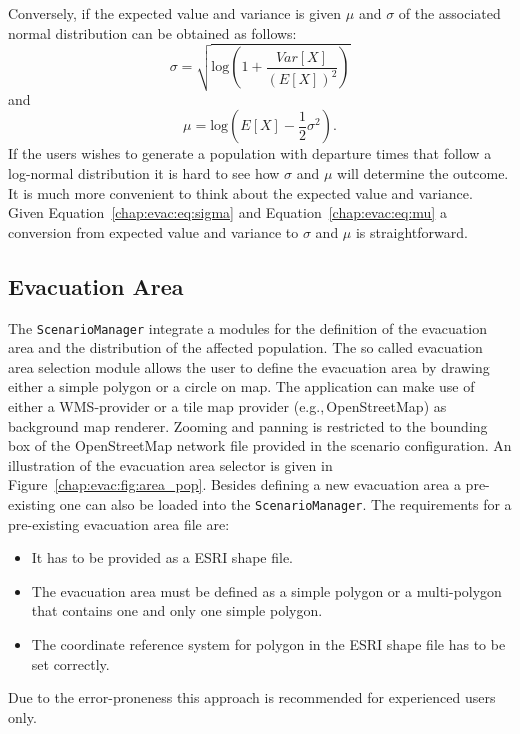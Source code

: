 Conversely, if the expected value and variance is given $\mu$ and $\sigma$ of the associated normal distribution can be obtained as follows:
\begin{equation}
\sigma = \sqrt{\text{log}(1+\frac{Var[X]}{(E[X])^2})}\label{chap:evac:eq:sigma}
\end{equation}
and 
\begin{equation}
\mu = \text{log}(E[X] - \frac{1}{2}\sigma^2).\label{chap:evac:eq:mu}
\end{equation}
If the users wishes to generate a population with departure times that follow a log-normal distribution it is hard to see how $\sigma$ and $\mu$ will determine the outcome. It is much more convenient to think about the expected value and variance. Given Equation~\ref{chap:evac:eq:sigma} and Equation~\ref{chap:evac:eq:mu} a conversion from expected value and variance to $\sigma$ and $\mu$ is straightforward.

\subsection{Evacuation Area}%
The \lstinline|ScenarioManager| integrate a modules for the definition of the evacuation area and the distribution of the affected population. The so called evacuation area selection module allows the user to define the evacuation area by drawing either a simple polygon or a circle on map. The application can make use of either a WMS-provider or a tile map provider (e.g.,\,OpenStreetMap) as background map renderer. Zooming and panning is restricted to the bounding box of the OpenStreetMap network file provided in the scenario configuration. An illustration of the evacuation area selector is given in Figure~\ref{chap:evac:fig:area_pop}. Besides defining a new evacuation area a pre-existing one can also be loaded into the \lstinline|ScenarioManager|. The requirements for a pre-existing evacuation area file are:
\begin{itemize}
\item It has to be provided as a ESRI shape file.
\item The evacuation area must be defined as a simple polygon or a multi-polygon that contains one and only one simple polygon.
\item The coordinate reference system for polygon in the ESRI shape file has to be set correctly. 
\end{itemize}
Due to the error-proneness this approach is recommended for experienced users only.

